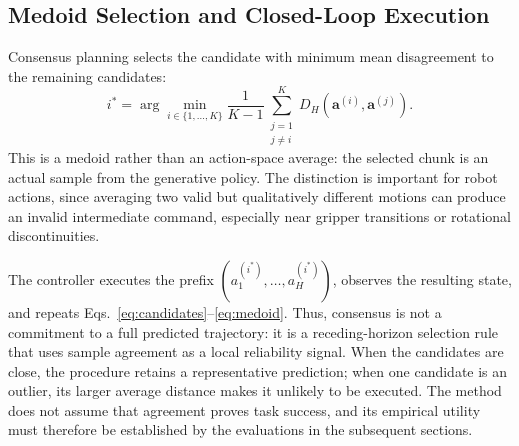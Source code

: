 \documentclass{article}
\begin{document}
\subsection{Medoid Selection and Closed-Loop Execution}

Consensus planning selects the candidate with minimum mean disagreement to the
remaining candidates:
\begin{equation}
    i^* = \arg\min_{i\in\{1,\ldots,K\}}
    \frac{1}{K-1}\sum_{\substack{j=1 \\ j\neq i}}^K
    D_H\!\left(\mathbf{a}^{(i)},\mathbf{a}^{(j)}\right).
    \label{eq:medoid}
\end{equation}
This is a medoid rather than an action-space average: the selected chunk is an
actual sample from the generative policy. The distinction is important for
robot actions, since averaging two valid but qualitatively different motions can
produce an invalid intermediate command, especially near gripper transitions or
rotational discontinuities.

The controller executes the prefix
$\left(a^{(i^*)}_1,\ldots,a^{(i^*)}_H\right)$, observes the resulting state,
and repeats Eqs.~\eqref{eq:candidates}--\eqref{eq:medoid}. Thus, consensus is
not a commitment to a full predicted trajectory: it is a receding-horizon
selection rule that uses sample agreement as a local reliability signal. When
the candidates are close, the procedure retains a representative prediction;
when one candidate is an outlier, its larger average distance makes it unlikely
to be executed. The method does not assume that agreement proves task success,
and its empirical utility must therefore be established by the evaluations in
the subsequent sections.
\end{document}
